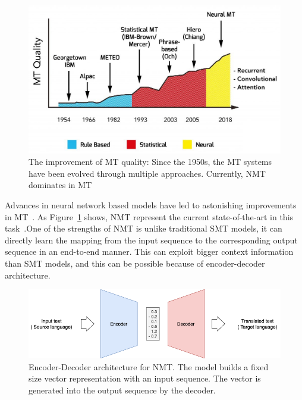 \begin{figure}[H]
    \centering
    \includegraphics[scale=0.30]{images/A-brief-history-of-MT.jpeg}
    \caption{The improvement of MT quality: Since the 1950s, the MT systems have been evolved through multiple approaches. Currently, NMT dominates in MT~\parencite{iconictranslation}}
    \label{fig:brief_history}
\end{figure}

Advances in neural network based models have led to astonishing improvements in MT~\parencite{sutskever2014sequence, bahdanau2014neural, vaswani2017attention}. As Figure~\ref{fig:brief_history} shows, NMT represent the current state-of-the-art in this task~\parencite{hassan2018achieving}.One of the strengths of NMT is unlike traditional SMT models, it can directly learn the mapping from the input sequence to the corresponding output sequence in an end-to-end manner. This can exploit bigger context information than SMT models, and this can be possible because of encoder-decoder architecture.

\begin{figure}[ht]
    \centering
    \includegraphics[scale=0.6]{images/encoder-decoder.png}
    \caption{Encoder-Decoder architecture for NMT. The model builds a fixed size vector representation with an input sequence. The vector is generated into the output sequence by the decoder.  }
    \label{fig:encoder_decoder}
\end{figure}

